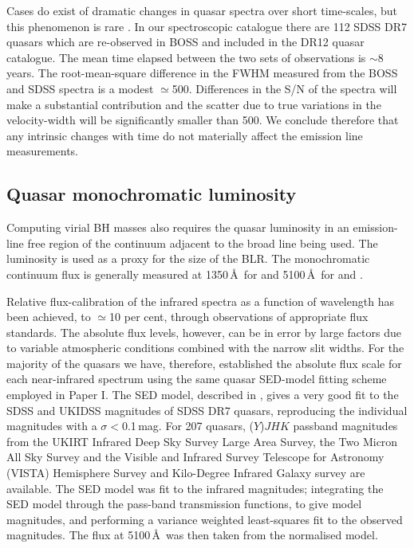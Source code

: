 Cases do exist of dramatic changes in quasar spectra over short time-scales, but this phenomenon is rare \citep{macleod16}. 
In our spectroscopic catalogue there are 112 SDSS DR7 quasars which are re-observed in BOSS and included in the DR12 quasar catalogue. 
The mean time elapsed between the two sets of observations is $\sim$8 years. 
The root-mean-square difference in the  FWHM measured from the BOSS and SDSS spectra is a modest $\simeq$500\kms. 
Differences in the S/N of the spectra will make a substantial contribution and the scatter due to true variations in the  velocity-width will be significantly smaller than 500\kms. 
We conclude therefore that any intrinsic changes with time do not materially affect the emission line measurements.

\subsection{Quasar monochromatic luminosity}

Computing virial BH masses also requires the quasar luminosity in an emission-line free region of the continuum adjacent to the broad line being used. 
The luminosity is used as a proxy for the size of the BLR. 
The monochromatic continuum flux is generally measured at 1350\,\AA\ for  and 5100\,\AA\, for \ha and \hbns. 

Relative flux-calibration of the infrared spectra as a function of wavelength has been achieved, to $\simeq$10 per cent, through observations of appropriate flux standards. 
The absolute flux levels, however, can be in error by large factors due to variable atmospheric conditions combined with the narrow slit widths. 
For the majority of the quasars we have, therefore, established the absolute flux scale for each near-infrared spectrum using the same quasar SED-model fitting scheme employed in Paper I.
The SED model, described in \citet{maddox12}, gives a very good fit to the SDSS and UKIDSS magnitudes of SDSS DR7 quasars, reproducing the individual magnitudes with a $\sigma <$0.1\,mag. 
For 207 quasars, ($Y$)$JHK$ passband magnitudes from the UKIRT Infrared Deep Sky Survey \citep[UKIDSS;][]{lawrence07} Large Area Survey, the Two Micron All Sky Survey \citep[2MASS;][]{skrutskie06} and the Visible and Infrared Survey Telescope for Astronomy (VISTA) Hemisphere Survey \citep[VHS;][]{mcmahon13} and Kilo-Degree Infrared Galaxy \citep[VIKING;][]{edge13} survey are available. 
The SED model was fit to the infrared magnitudes; integrating the SED model through the pass-band transmission functions, to give model magnitudes, and performing a variance weighted least-squares fit to the observed magnitudes. 
The flux at 5100\,\AA\, was then taken from the normalised model.

